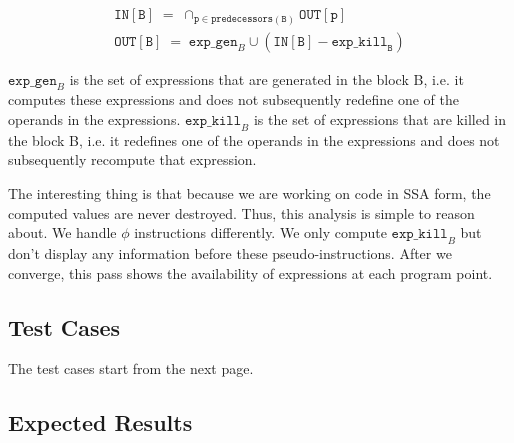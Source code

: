 \begin{align*}
\texttt{IN}[\mathtt{B}] \; = \; \cap_{\mathtt{p} \in \texttt{predecessors}(\mathtt{B})} \texttt{OUT}[\texttt{p}] \\
\texttt{OUT}[\mathtt{B}] \; = \; \texttt{exp\_gen}_{B} \cup (\texttt{IN}[\mathtt{B}] - \texttt{exp\_kill}_{\texttt{B}})
\end{align*}

$\texttt{exp\_gen}_{B}$ is the set of expressions that are generated in the block B, i.e. it computes these
expressions and does not subsequently redefine one of the operands in the expressions.
$\texttt{exp\_kill}_{B}$ is the set of expressions that are killed in the block B, i.e. it
redefines one of the operands in the expressions and does not subsequently recompute that expression.

The interesting thing is that because we are working on code in SSA form, the computed values are never
destroyed. Thus, this analysis is simple to reason about.
We handle $\phi$ instructions differently. We only compute $\texttt{exp\_kill}_{B}$ but don't display any
information before these pseudo-instructions.
After we converge, this pass shows the availability of expressions at each program point.



%

\subsection{Test Cases}

The test cases start from the next page.



\subsection{Expected Results}

